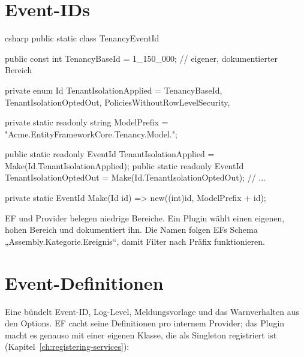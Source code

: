 \section{Event-IDs}

\begin{sourcecode}{csharp}
public static class TenancyEventId
{
    public const int TenancyBaseId = 1_150_000;     // eigener, dokumentierter Bereich

    private enum Id
    {
        TenantIsolationApplied = TenancyBaseId,
        TenantIsolationOptedOut,
        PoliciesWithoutRowLevelSecurity,
    }

    private static readonly string ModelPrefix = "Acme.EntityFrameworkCore.Tenancy.Model.";

    public static readonly EventId TenantIsolationApplied =
        Make(Id.TenantIsolationApplied);
    public static readonly EventId TenantIsolationOptedOut =
        Make(Id.TenantIsolationOptedOut);
    // ...

    private static EventId Make(Id id) => new((int)id, ModelPrefix + id);
}
\end{sourcecode}

EF und Provider belegen niedrige Bereiche. Ein Plugin wählt einen eigenen, hohen Bereich und
dokumentiert ihn. Die Namen folgen EFs Schema „Assembly.Kategorie.Ereignis“, damit Filter
nach Präfix funktionieren.

\section{Event-Definitionen}

Eine  bündelt Event-ID, Log-Level,
Meldungsvorlage und das Warnverhalten aus den Options. EF cacht seine Definitionen pro
internem Provider; das Plugin macht es genauso mit einer eigenen Klasse, die als Singleton
registriert ist (Kapitel~\ref{ch:registering-services}):

